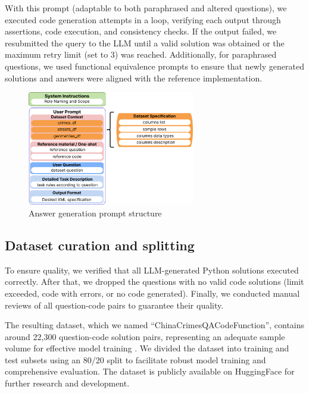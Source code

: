 With this prompt (adaptable to both paraphrased and altered questions), we executed code generation attempts in a loop, verifying each output through assertions, code execution, and consistency checks. If the output failed, we resubmitted the query to the LLM until a valid solution was obtained or the maximum retry limit (set to 3) was reached. Additionally, for paraphrased questions, we used functional equivalence prompts to ensure that newly generated solutions and answers were aligned with the reference implementation.

\begin{figure}[H]
  \centering
  \includegraphics[width=0.65\textwidth]{images/answer_gen.png}
  \caption{Answer generation prompt structure}
  \label{fig:answer_generation_prompt_structure}
\end{figure}


\subsection{Dataset curation and splitting}

To ensure quality, we verified that all LLM-generated Python solutions executed correctly. After that, we dropped the questions with no valid code solutions (limit exceeded, code with errors, or no code generated). Finally, we conducted manual reviews of all question-code pairs to guarantee their quality.

The resulting dataset, which we named ``ChinaCrimesQACodeFunction'', contains around 22,300 question-code solution pairs, representing an adequate sample volume for effective model training \citep{Unsloth2024Dataset1}. We divided the dataset into training and test subsets using an 80/20 split to facilitate robust model training and comprehensive evaluation. The dataset is publicly available on HuggingFace for further research and development.  %

